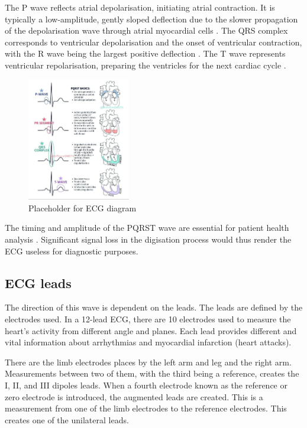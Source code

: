The P wave reflects atrial depolarisation, initiating atrial contraction. It is typically a low-amplitude, gently sloped deflection due to the slower propagation of the depolarisation wave through atrial myocardial cells \cite{OReilly2023ModelDrivenAO}. The QRS complex corresponds to ventricular depolarisation and the onset of ventricular contraction, with the R wave being the largest positive deflection \cite{Prima2018PolyanilineAN}. The T wave represents ventricular repolarisation, preparing the ventricles for the next cardiac cycle \cite{Prima2018PolyanilineAN}.

\begin{figure}[H]
    \centering
    \includegraphics[width=0.4\textwidth]{3_Chapters/2_Chapter_LiteratureReview/Figures/PQRST_complex.jpg}
    \caption{Placeholder for ECG diagram}
    \label{fig:ECG_Waveform}
\end{figure}

The timing and amplitude of the PQRST wave are essential for patient health analysis \cite{Sinha2023SemiSupervisedCD}. Significant signal loss in the digisation process would thus render the ECG useless for diagnostic purposes.

\subsection{ECG leads}

The direction of this wave is dependent on the leads. The leads are defined by the electrodes used. In a 12-lead ECG, there are 10 electrodes used to measure the heart's activity from different angle and planes. Each lead provides different and vital information about arrhythmias and myocardial infarction (heart attacks). 

There are the limb electrodes places by the left arm and leg and the right arm. Measurements between two of them, with the third being a reference, creates the I, II, and III dipoles leads. When a fourth electrode known as the reference or zero electrode is introduced, the augmented leads are created. This is a measurement from one of the limb electrodes to the reference electrodes. This creates one of the unilateral leads. 

